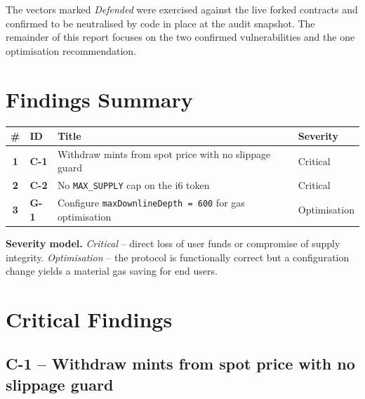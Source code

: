 \documentclass[11pt,a4paper]{article}
\begin{document}
The vectors marked \emph{Defended} were exercised against the live forked
contracts and confirmed to be neutralised by code in place at the audit
snapshot. The remainder of this report focuses on the two confirmed
vulnerabilities and the one optimisation recommendation.

\newpage

\section{Findings Summary}

\begin{center}
\renewcommand{\arraystretch}{1.4}
\begin{tabular}{>{\bfseries}c >{\bfseries}p{1.9cm} p{8.2cm} >{\centering\arraybackslash}p{2.2cm}}
\toprule
\textbf{\#} & \textbf{ID} & \textbf{Title} & \textbf{Severity} \\
\midrule
1 & C-1 & Withdraw mints from spot price with no slippage guard          & \textcolor{critred}{Critical} \\
2 & C-2 & No \texttt{MAX\_SUPPLY} cap on the i6 token                    & \textcolor{critred}{Critical} \\
3 & G-1 & Configure \texttt{maxDownlineDepth = 600} for gas optimisation & \textcolor{optblue}{Optimisation} \\
\bottomrule
\end{tabular}
\end{center}

\vspace{0.3cm}
\textbf{Severity model.}
\textit{Critical} -- direct loss of user funds or compromise of supply
integrity.
\textit{Optimisation} -- the protocol is functionally correct but a
configuration change yields a material gas saving for end users.

\newpage

\section{Critical Findings}

\subsection{C-1 -- Withdraw mints from spot price with no slippage guard}
\end{document}
